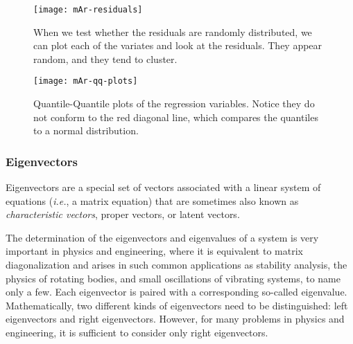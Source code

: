 \begin{figure}[tb]
  \centering
  \texttt{[image: mAr-residuals]}
  \caption[Plotting Vector Autoregressive Residuals]{When we test whether the residuals are randomly distributed, we can plot each of the variates and look at the residuals. They appear random, and they tend to cluster.}
  \label{figure:mAr-residuals}
\end{figure}

\begin{figure}[tb]
  \centering
  \texttt{[image: mAr-qq-plots]}
  \caption[Q-Q Plots of VAR Residuals]{Quantile-Quantile plots of the regression variables. Notice they do not conform to the red diagonal line, which compares the quantiles to a normal distribution.}
  \label{figure:mAr-qq-plots}
\end{figure}
\clearpage

\subsubsection{Eigenvectors}\label{eigenvectors}

Eigenvectors are a special set of vectors associated with a linear system of equations (\textit{i.e.}, a matrix equation) that are sometimes also known as \emph{characteristic vectors}, proper vectors, or latent vectors.

The determination of the eigenvectors and eigenvalues of a system is very important in physics and engineering, where it is equivalent to matrix diagonalization and arises in such common applications as stability analysis, the physics of rotating bodies, and small oscillations of vibrating systems, to name only a few. Each eigenvector is paired with a corresponding so-called eigenvalue. Mathematically, two different kinds of eigenvectors need to be distinguished: left eigenvectors and right eigenvectors. However, for many problems in physics and engineering, it is sufficient to consider only right eigenvectors.

